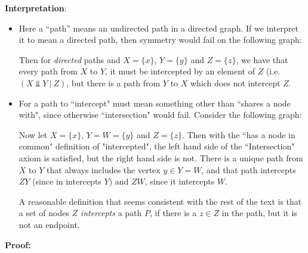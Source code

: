 \documentclass{article}
\newcommand{\given}{\ |\ }
\begin{document}
\textbf{Interpretation}:
\begin{itemize}
    \item Here a ``path'' means an undirected path in a directed graph. If we interpret it to mean a directed path, then symmetry would fail on the following graph:


    Then for \textit{directed} paths and $X=\{x\}$, $Y=\{y\}$ and $Z=\{z\}$, we have that every path from $X$ to $Y$, it must be intercepted by an element of $Z$ (i.e. $\left(X\Perp Y \given Z\right)$, but there is a path from $Y$ to $X$ which does not intercept $Z$.
\item For a path to ``intercept" must mean something other than ``shares a node with", since otherwise ``intersection" would fail. Consider the following graph:

    
    Now let $X=\{x\}$, $Y=W=\{y\}$ and $Z=\{z\}$. Then with the ``has a node in common" definition of "intercepted", the left hand side of the ``Intersection" axiom is satisfied, but the right hand side is not. There is a unique path from $X$ to $Y$ that always includes the vertex $y\in Y=W$, and that path intercepts $ZY$ (since in intercepts $Y$) and $ZW$, since it intercepts $W$.
    
    A reasonable definition that seems consistent with the rest of the text is that a set of nodes $Z$ \textit{intercepts} a path $P$, if there is a $z\in Z$ in the path, but it is not an endpoint.
\end{itemize}
\textbf{Proof:} 
\end{document}
